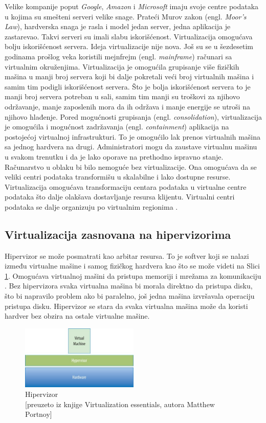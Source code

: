 \documentclass[12pt,oneside]{memoir}
\begin{document}
Velike kompanije poput \emph{Google}, \emph{Amazon} i \emph{Microsoft} imaju svoje centre podataka u kojima su smešteni serveri velike snage. Prateći Murov zakon (engl. \emph{Moor's Law}), hardverska snaga je rasla i model jedan server, jedna aplikacija je zastarevao. Takvi serveri su imali slabu iskorišćenost. Virtualizacija omogućava bolju iskorišćenost servera. Ideja virtualizacije nije nova. Još su se u šezdesetim godinama prošlog veka koristili mejnfrejm (engl. \emph{mainframe}) računari sa virtualnim okruženjima. Virtualizacija je omogućila grupisanje više fizičkih mašina u manji broj servera koji bi dalje pokretali veći broj virtualnih mašina i samim tim podigli iskorišćenost servera. Što je bolja iskorišćenost servera to je manji broj servera potreban u sali, samim tim manji su troškovi za njihovo održavanje, manje zaposlenih mora da ih održava i manje energije se utroši na njihovo hlađenje. Pored mogućnosti grupisanja (engl. \emph{consolidation}), virtualizacija je omogućila i mogućnost zadržavanja (engl. \emph{containment}) aplikacija na postojećoj virtualnoj infrastrukturi. To je omogućilo lak prenos virtualnih mašina sa jednog hardvera na drugi. Administratori mogu da zaustave virtualnu mašinu u svakom trenutku i da je lako oporave na prethodno ispravno stanje. Računarstvo u oblaku bi bilo nemoguće bez virtualizacije. Ona omogućava da se veliki centri podataka transformišu u skalabilne i lako dostupne resurse. Virtualizacija omogućava transformaciju centara podataka u virtualne centre podataka što dalje olakšava dostavljanje resursa klijentu. Virtualni centri podataka se dalje organizuju po virtualnim regionima \cite{ve}.

\subsection{Virtualizacija zasnovana na hipervizorima}
Hipervizor se može posmatrati kao arbitar resursa. To je softver koji se nalazi između virtualne mašine i samog fizičkog hardvera kao što se može videti na Slici \ref{fig:hipervizor}. Omogućava virtualnoj mašini da pristupa memoriji i mrežama za komunikaciju \cite{ve}. Bez hipervizora svaka virtualna mašina bi morala direktno da pristupa disku, što bi napravilo problem ako bi paralelno, još jedna mašina izvršavala operaciju pristupa disku. Hipervizor se stara da svaka virtualna mašina može da koristi hardver bez obzira na ostale virtualne mašine.
\begin{figure}[!ht]
  \centering
  \includegraphics[width=0.5\textwidth]{Slika 1.jpg}
  \caption{Hipervizor\\\footnotesize[preuzeto iz knjige Virtualization essentials, autora Matthew Portnoy]}
  \label{fig:hipervizor}
\end{figure}
 
\end{document}
